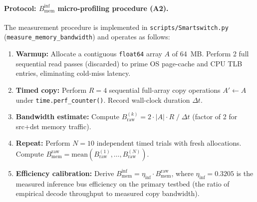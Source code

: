 \documentclass[11pt,a4paper]{article}
\newcommand{\Binf}{B_{\mathrm{mem}}^{\mathrm{inf}}}
\newcommand{\Braw}{B_{\mathrm{mem}}^{\mathrm{raw}}}
\newcommand{\code}[1]{\texttt{#1}}
\begin{document}
\paragraph{Protocol: $\Binf$ micro-profiling procedure (A2).}
The measurement procedure is implemented in \code{scripts/Smartswitch.py} (\code{measure\_memory\_bandwidth}) and operates as follows:

\begin{enumerate}[leftmargin=*]
  \item \textbf{Warmup:} Allocate a contiguous \texttt{float64} array $A$ of 64~MB. Perform 2 full sequential read passes (discarded) to prime OS page-cache and CPU TLB entries, eliminating cold-miss latency.
  \item \textbf{Timed copy:} Perform $R=4$ sequential full-array copy operations $A' \leftarrow A$ under \code{time.perf\_counter()}. Record wall-clock duration $\Delta t$.
  \item \textbf{Bandwidth estimate:} Compute $B_{\mathrm{raw}}^{(k)} = 2 \cdot |A| \cdot R \;/\; \Delta t$ (factor of 2 for src+dst memory traffic).
  \item \textbf{Repeat:} Perform $N=10$ independent timed trials with fresh allocations. Compute $\Braw = \mathrm{mean}(B_{\mathrm{raw}}^{(1)},\ldots,B_{\mathrm{raw}}^{(N)})$.
  \item \textbf{Efficiency calibration:} Derive $\Binf = \eta_{\mathrm{inf}} \cdot \Braw$, where $\eta_{\mathrm{inf}} = 0.3205$ is the measured inference bus efficiency on the primary testbed (the ratio of empirical decode throughput to measured copy bandwidth).
\end{enumerate}
\end{document}

